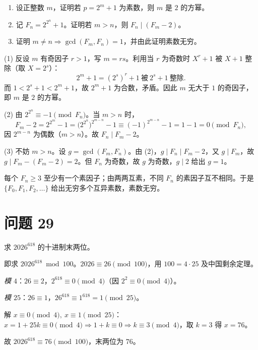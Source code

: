 \documentclass{article}
\begin{document}
\begin{enumerate}[(1)]
  \item 设正整数 $m$，证明若 $p=2^m+1$ 为素数，则 $m$ 是 $2$ 的方幂。
  \item 记 $F_n=2^{2^n}+1$。证明若 $m>n$，则 $F_n\mid(F_m-2)$。
  \item 证明 $m\ne n\Rightarrow\gcd(F_m,F_n)=1$，并由此证明素数无穷。
\end{enumerate}

\begin{solution}
  (1) 反设 $m$ 有奇因子 $r>1$，写 $m=rs$。利用当 $r$ 为奇数时 $X^r+1$ 被 $X+1$ 整除（取 $X=2^s$）：
  \[
    2^m+1=(2^s)^r+1\ \text{被}\ 2^s+1\ \text{整除}.
  \]
  而 $1<2^s+1<2^m+1$，故 $2^m+1$ 为合数，矛盾。因此 $m$ 无大于 $1$ 的奇因子，即 $m$ 是 $2$ 的方幂。

  (2) 由 $2^{2^n}\equiv-1\pmod{F_n}$。当 $m>n$ 时，
  \[
    F_m-2=2^{2^m}-1=\big(2^{2^n}\big)^{2^{m-n}}-1\equiv(-1)^{2^{m-n}}-1=1-1=0\pmod{F_n},
  \]
  因 $2^{m-n}$ 为偶数（$m>n$）。故 $F_n\mid F_m-2$。

  (3) 不妨 $m>n$。设 $g=\gcd(F_m,F_n)$。由 (2)，$g\mid F_n\mid F_m-2$，又 $g\mid F_m$，故 $g\mid F_m-(F_m-2)=2$。但 $F_n$ 为奇数，故 $g$ 为奇数，$g\mid2$ 给出 $g=1$。

  每个 $F_n\ge3$ 至少有一个素因子；由两两互素，不同 $F_n$ 的素因子互不相同。于是 $\{F_0,F_1,F_2,\dots\}$ 给出无穷多个互异素数，素数无穷。
\end{solution}

\section{问题 29}

求 $2026^{618}$ 的十进制末两位。

\begin{solution}
  即求 $2026^{618}\bmod100$。$2026\equiv26\pmod{100}$，用 $100=4\cdot25$ 及中国剩余定理。

  \emph{模 $4$}：$26\equiv2$，$2^{618}\equiv0\pmod4$（因 $2^2\equiv0\pmod4$）。

  \emph{模 $25$}：$26\equiv1$，$26^{618}\equiv1^{618}=1\pmod{25}$。

  解 $x\equiv0\pmod4,\ x\equiv1\pmod{25}$：$x=1+25k\equiv0\pmod4\Rightarrow1+k\equiv0\Rightarrow k\equiv3\pmod4$，取 $k=3$ 得 $x=76$。

  故 $2026^{618}\equiv76\pmod{100}$，末两位为 $\boxed{76}$。
\end{solution}
\end{document}
